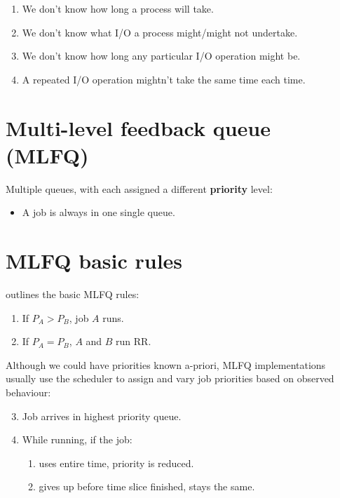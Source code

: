 \begin{enumerate}
\item We don't know how long a process will take.
\item We don't know what I/O a process might/might not undertake.
\item We don't know how long any particular I/O operation might be.
\item A repeated I/O operation mightn't take the same time each time.
\end{enumerate}


\section{Multi-level feedback queue (MLFQ)}

Multiple queues, with each assigned a different \textbf{priority} level:
\begin{itemize}
\item A job is always in one single queue.
\end{itemize}

\section{MLFQ basic rules}
\label{sec:mlfq-rules}

\citet[Chapter 8]{arpaci-dusseau:2015:operating} outlines the basic MLFQ rules:

\begin{enumerate}
\item If $P_A>P_B$, job $A$ runs. \label{item:mlfq-rule:greater-priority}
\item If $P_A=P_B$, $A$ and $B$ run RR. \label{item:mldq-rule:equal-priority}
\end{enumerate}

Although we could have priorities known a-priori, MLFQ implementations usually use the scheduler to assign and vary job priorities based on observed behaviour:


\begin{enumerate}
  \setcounter{enumi}{2}
\item Job arrives in highest priority queue. \label{item:mlfq-rule:arrives}
\item While running, if the job:
  \begin{enumerate}
  \item uses entire time, priority is reduced. \label{item:mlfq-rule:priority-down}
  \item gives up before time slice finished, stays the same. \label{item:mlfq-rule:stays-same}
  \end{enumerate}

\end{enumerate}

